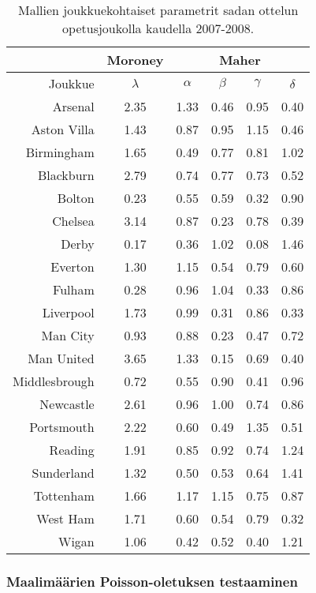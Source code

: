\documentclass[a4paper,finnish,titlepage,12pt]{article}
\begin{document}
\begin{table}[h!]
\caption{Mallien joukkuekohtaiset parametrit sadan ottelun opetusjoukolla kaudella 2007-2008.}
\begin{center}
    \begin{tabular}{|r||c||c|c|c|c|}
	\hline
	& Moroney & \multicolumn{4}{c|}{Maher} \\
        	\hline
	Joukkue & $\lambda$ & $\alpha$ & $\beta$ & $\gamma$ & $\delta$ \\ 
	\hline
	Arsenal & 2.35 & 1.33 & 0.46 & 0.95 & 0.40 \\
	Aston Villa & 1.43 & 0.87 & 0.95 & 1.15 & 0.46 \\
	Birmingham & 1.65 & 0.49 & 0.77 & 0.81 & 1.02 \\
	Blackburn & 2.79 & 0.74 & 0.77 & 0.73 & 0.52 \\
	Bolton & 0.23 & 0.55 & 0.59 & 0.32 & 0.90 \\
	Chelsea & 3.14 & 0.87 & 0.23 & 0.78 & 0.39 \\
	Derby & 0.17 & 0.36 & 1.02 & 0.08 & 1.46 \\
	Everton & 1.30 & 1.15 & 0.54 & 0.79 & 0.60 \\
	Fulham & 0.28 & 0.96 & 1.04 & 0.33 & 0.86 \\
	Liverpool & 1.73 & 0.99 & 0.31 & 0.86 & 0.33 \\
	Man City & 0.93 & 0.88 & 0.23 & 0.47 & 0.72 \\
	Man United & 3.65 & 1.33 & 0.15 & 0.69 & 0.40 \\
	Middlesbrough & 0.72 & 0.55 & 0.90 & 0.41 & 0.96 \\
	Newcastle & 2.61 & 0.96 & 1.00 & 0.74 & 0.86 \\
	Portsmouth & 2.22 & 0.60 & 0.49 & 1.35 & 0.51 \\
	Reading & 1.91 & 0.85 & 0.92 & 0.74 & 1.24 \\
	Sunderland & 1.32 & 0.50 & 0.53 & 0.64 & 1.41 \\
	Tottenham & 1.66 & 1.17 & 1.15 & 0.75 & 0.87 \\
	West Ham & 1.71 & 0.60 & 0.54 & 0.79 & 0.32 \\
	Wigan & 1.06 & 0.42 & 0.52 & 0.40 & 1.21 \\
        \hline
    \end{tabular}
\end{center}
\end{table}

\subsubsection{Maalimäärien Poisson-oletuksen testaaminen}
\end{document}
